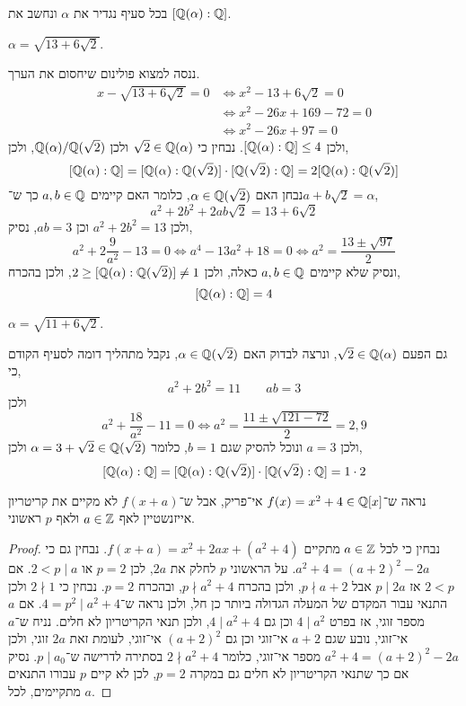 \question{}
בכל סעיף נגדיר את $\alpha$ ונחשב את $[\mathbb{Q}(\alpha) : \mathbb{Q}]$.

\subquestion{}
$\alpha = \sqrt{13 + 6 \sqrt{2}}$.
\begin{solution}
	ננסה למצוא פולינום שיחסום את הערך.
	\begin{align*}
		x - \sqrt{13 + 6 \sqrt{2}} = 0
		& \iff x^2 - 13 + 6 \sqrt{2} = 0 \\
		& \iff x^2 - 26 x + 169 - 72 = 0 \\
		& \iff x^2 - 26 x + 97 = 0
	\end{align*}
	ולכן $[\mathbb{Q}(\alpha) : \mathbb{Q}] \le 4$.
	נבחין כי $\sqrt{2} \in \mathbb{Q}(\alpha)$ ולכן $\mathbb{Q}(\alpha) / \mathbb{Q}(\sqrt{2})$, ולכן,
	\[
		[\mathbb{Q}(\alpha) : \mathbb{Q}]
		= [\mathbb{Q}(\alpha) : \mathbb{Q}(\sqrt{2})] \cdot [\mathbb{Q}(\sqrt{2}) : \mathbb{Q}]
		= 2 [\mathbb{Q}(\alpha) : \mathbb{Q}(\sqrt{2})]
	\]
	נבחן האם $\alpha \in \mathbb{Q}(\sqrt{2})$, כלומר האם קיימים $a, b \in \mathbb{Q}$ כך ש־$a + b \sqrt{2} = \alpha$,
	\[
		a^2 + 2b^2 + 2ab \sqrt{2} = 13 + 6 \sqrt{2}
	\]
	ולכן $a^2 + 2b^2 = 13$ וכן $ab = 3$, נסיק,
	\[
		a^2 + 2 \frac{9}{a^2} - 13 = 0
		\iff a^4 - 13 a^2 + 18 = 0
		\iff a^2 = \frac{13 \pm \sqrt{97}}{2}
	\]
	ונסיק שלא קיימים $a, b \in \mathbb{Q}$ כאלה, ולכן $2 \ge [\mathbb{Q}(\alpha) : \mathbb{Q}(\sqrt{2})] \ne 1$, ולכן בהכרח,
	\[
		[\mathbb{Q}(\alpha) : \mathbb{Q}] = 4
	\]
\end{solution}

\subquestion{}
$\alpha = \sqrt{11 + 6 \sqrt{2}}$.
\begin{solution}
	גם הפעם $\sqrt{2} \in \mathbb{Q}(\alpha)$, ונרצה לבדוק האם $\alpha \in \mathbb{Q}(\sqrt{2})$, נקבל מתהליך דומה לסעיף הקודם כי,
	\[
		a^2 + 2 b^2 = 11
		\qquad
		ab = 3
	\]
	ולכן
	\[
		a^2 + \frac{18}{a^2} - 11 = 0
		\iff a^2 = \frac{11 \pm \sqrt{121 - 72}}{2} = 2, 9
	\]
	ולכן $a = 3$ ונוכל להסיק שגם $b = 1$, כלומר $\alpha = 3 + \sqrt{2} \in \mathbb{Q}(\sqrt{2})$ ולכן,
	\[
		[\mathbb{Q}(\alpha) : \mathbb{Q}]
		= [\mathbb{Q}(\alpha) : \mathbb{Q}(\sqrt{2})] \cdot [\mathbb{Q}(\sqrt{2}) : \mathbb{Q}]
		= 1 \cdot 2
	\]
\end{solution}

\question{}
נראה ש־$f(x) = x^2 + 4 \in \mathbb{Q}[x]$ אי־פריק, אבל ש־$f(x + a)$ לא מקיים את קריטריון אייזנשטיין לאף $a \in \mathbb{Z}$ ולאף $p$ ראשוני.
\begin{proof}
	נבחין כי לכל $a \in \mathbb{Z}$ מתקיים $f(x + a) = x^2 + 2a x + (a^2 + 4)$.
	נבחין גם כי $a^2 + 4 = {(a + 2)}^2 - 2a$.
	על הראשוני $p$ לחלק את $2a$, לכן $p = 2$ או $2 < p \mid a$.
	אם $2 < p$ אז $p \mid 2a$ אבל $p \nmid a + 2$, ולכן בהכרח $p \nmid a^2 + 4$, ובהכרח $p = 2$.
	נבחין כי $2 \nmid 1$ ולכן התנאי עבור המקדם של המעלה הגדולה ביותר כן חל, ולכן נראה ש־$4 = p^2 \mid a^2 + 4$.
	אם $a$ מספר זוגי, אז בפרט $4 \mid a^2$ וכן גם $4 \mid a^2 + 4$, ולכן תנאי הקריטריון לא חלים.
	נניח ש־$a$ אי־זוגי, נובע שגם $a + 2$ אי־זוגי וכן גם ${(a + 2)}^2$ אי־זוגי, לעומת זאת $2a$ זוגי, ולכן $a^2 + 4 = {(a + 2)}^2 - 2a$ מספר אי־זוגי, כלומר $2 \nmid a^2 + 4$ בסתירה לדרישה ש־$p \mid a_0$.
	נסיק אם כך שתנאי הקריטריון לא חלים גם במקרה $p = 2$, לכן לא קיים $p$ עבורו התנאים מתקיימים, לכל $a$.
\end{proof}


